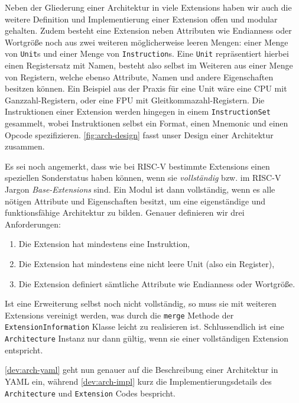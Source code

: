 Neben der Gliederung einer Architektur in viele Extensions haben wir auch die
weitere Definition und Implementierung einer Extension offen und modular
gehalten. Zudem besteht eine Extension neben Attributen wie Endianness oder
Wortgröße noch aus zwei weiteren möglicherweise leeren Mengen: einer Menge von
\texttt{Unit}s und einer Menge von \texttt{Instruction}s. Eine \texttt{Unit}
repräsentiert hierbei einen Registersatz mit Namen, besteht also selbst im
Weiteren aus einer Menge von Registern, welche ebenso Attribute, Namen und
andere Eigenschaften besitzen können. Ein Beispiel aus der Praxis für eine Unit wäre eine CPU
mit Ganzzahl-Registern, oder eine FPU mit Gleitkommazahl-Registern.
Die Instruktionen einer Extension werden hingegen in einem
\texttt{InstructionSet} gesammelt, wobei Instruktionen selbst ein Format, einen
Mnemonic und einen Opcode spezifizieren. \autoref{fig:arch-design} fasst unser
Design einer Architektur zusammen.

Es sei noch angemerkt, dass wie bei RISC-V bestimmte Extensions einen speziellen
Sonderstatus haben können, wenn sie \emph{vollständig} bzw. im RISC-V Jargon
\emph{Base-Extensions} sind. Ein Modul ist dann vollständig, wenn es alle
nötigen Attribute und Eigenschaften besitzt, um eine eigenständige und
funktionsfähige Architektur zu bilden. Genauer definieren wir drei
Anforderungen:
\begin{enumerate}
  \item Die Extension hat mindestens eine Instruktion,
  \item Die Extension hat mindestens eine nicht leere Unit (also ein Register),
  \item Die Extension definiert sämtliche Attribute wie Endianness oder Wortgröße.
\end{enumerate}

Ist eine Erweiterung selbst noch nicht vollständig, so muss sie mit weiteren
Extensions vereinigt werden, was durch die \texttt{merge}
Methode der \texttt{ExtensionInformation} Klasse leicht zu realisieren ist.
Schlussendlich ist eine \texttt{Architecture} Instanz nur dann gültig, wenn sie
einer vollständigen Extension entspricht.

\autoref{dev:arch-yaml} geht nun genauer auf die Beschreibung einer Architektur
in YAML ein, während \autoref{dev:arch-impl} kurz die Implementierungsdetails
des \texttt{Architecture} und \texttt{Extension} Codes bespricht.
